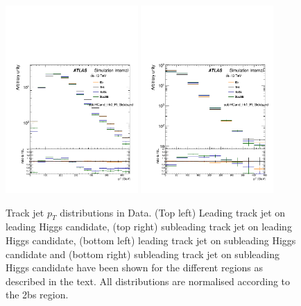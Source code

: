\begin{figure}[htbp!]
\begin{center}
\includegraphics[width=0.45\textwidth,angle=-90]{figures/boosted/AppendixDijetMC/sublHCand_trk0_Pt_SidebandwoPr_data.pdf}
\includegraphics[width=0.45\textwidth,angle=-90]{figures/boosted/AppendixDijetMC/sublHCand_trk1_Pt_SidebandwoPr_data.pdf}

 \caption{Track jet $p_{T}$ distributions in Data. (Top left) Leading track jet on leading Higgs candidate, (top right) subleading track jet on leading Higgs candidate, (bottom left) leading track jet on subleading Higgs candidate and (bottom right) subleading track jet on subleading Higgs candidate have been shown for the different regions as described in the text. All distributions are normalised according to the 2bs region.}

\label{fig:TjData}
\end{center}
\end{figure}

